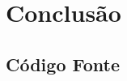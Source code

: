 \documentclass[mestrado, pre-defesa]{packages/icmc}
\begin{document}
\chapter{Conclusão}
\label{chapter:10_conclusion}


% 

\postextual





\glsaddall
\printglossaries


\begin{apendicesenv}
	\chapter{Código Fonte}
	\label{chapter:source_code}
	
\end{apendicesenv}




%    

\end{document}
